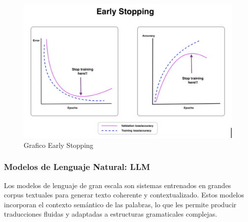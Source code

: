 \documentclass{article}
\begin{document}
\begin{figure}[!hbtp]
    \centering
    \includegraphics[width=5in]{figuras/EarlyStopping.png}
		\caption{Grafico Early Stopping}
		\label{fig3}
\end{figure}

\subsubsection{Modelos de Lenguaje Natural: LLM}

Los modelos de lenguaje de gran escala son sistemas entrenados en grandes corpus textuales para generar texto coherente y contextualizado. Estos modelos incorporan el contexto semántico de las palabras, lo que les permite producir traducciones fluidas y adaptadas a estructuras gramaticales complejas.
\end{document}
